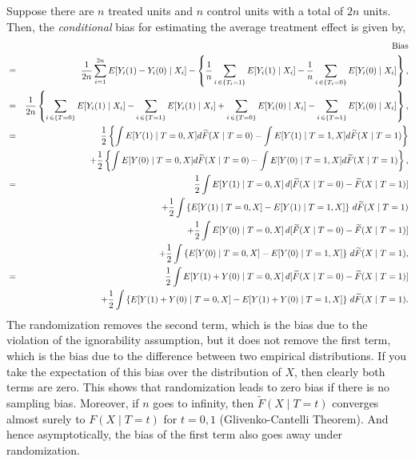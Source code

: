 \documentclass[11pt,titlepage]{article}
\begin{document}
\bigskip
{} Suppose 
there are $n$ treated units and $n$ control units with a total of $2n$
units. Then, the {\it conditional} bias for estimating the average
treatment effect is given by,
\begin{eqnarray*}
  &    & {\rm Bias} \\
  & =  & \frac{1}{2n} \sum_{i=1}^{2n} E[Y_i(1) -
  Y_i(0) \mid X_i] - \left\{\frac{1}{n} \sum_{i \, \in \{T_i =1 \}}
  E[Y_i(1) \mid X_i] - \frac{1}{n} \sum_{i \, \in \{T_i =0 \}}
  E[Y_i(0) \mid X_i] \right\}, \\
  & = & \frac{1}{2n} \left\{ \sum_{i\,\in \{T = 0\}} E[Y_i(1) \mid
  X_i] - \sum_{i\,\in \{T = 1\}} E[Y_i(1)
  \mid X_i] + \sum_{i\,\in \{T = 0\}}
  E[Y_i(0) \mid X_i] - \sum_{i\,\in \{T = 1\}} E[Y_i(0) \mid X_i]\right\}, \\
  & = & \frac{1}{2} \left\{\int E[Y(1) \mid T = 0, X] d\widetilde{F}(X \mid T =
  0) - \int E[Y(1) \mid T = 1, X] d\widetilde{F}(X \mid T =
  1)\right\} \\
  &  &  + \frac{1}{2} \left\{ \int E[Y(0) \mid T = 0, X] d\widetilde{F}(X \mid T =
  0) - \int E[Y(0) \mid T = 1, X] d\widetilde{F}(X \mid T =
  1)\right\}, \\
  & = &  \frac{1}{2} \int E[Y(1) \mid T = 0, X] \,d[\widetilde{F}(X \mid T
  = 0) - \widetilde{F}(X \mid T = 1)] \\
   &  & + \frac{1}{2} \int\left\{ E[Y(1) \mid T = 0, X] - E[Y(1) \mid T = 1,
  X]\right\}\, d\widetilde{F}(X \mid T = 1)\\
  &  & + \frac{1}{2} \int E[Y(0) \mid T = 0, X] \,d[\widetilde{F}(X \mid T
  = 0) - \widetilde{F}(X \mid T = 1)] \\
   &  & + \frac{1}{2} \int\left\{ E[Y(0) \mid T = 0, X] - E[Y(0) \mid T = 1,
  X]\right\}\, d\widetilde{F}(X \mid T = 1),\\
  & = &  \frac{1}{2} \int E[Y(1) + Y(0) \mid T = 0, X]\,d[\widetilde{F}(X \mid T
  = 0) - \widetilde{F}(X \mid T = 1)] \\
   &  & + \frac{1}{2} \int\left\{ E[Y(1) + Y(0) \mid T = 0, X] -
  E[Y(1) + Y(0)\mid T = 1,
  X]\right\}\, d\widetilde{F}(X \mid T = 1).
\end{eqnarray*}
The randomization removes the second term, which is the bias due to
the violation of the ignorability assumption, but it does not remove
the first term, which is the bias due to the difference between two
empirical distributions. If you take the expectation of this bias over
the distribution of $X$, then clearly both terms are zero. This shows
that randomization leads to zero bias if there is no sampling bias.
Moreover, if $n$ goes to infinity, then $\widetilde{F}(X \mid T = t)$
converges almost surely to $F(X \mid T=t)$ for $t=0,1$
(Glivenko-Cantelli Theorem). And hence asymptotically, the bias of the
first term also goes away under randomization.
\end{document}
